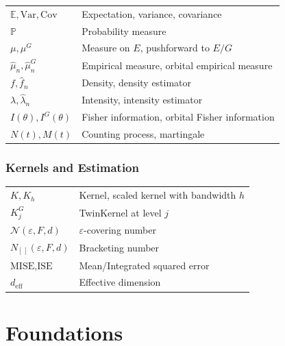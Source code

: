\documentclass[11pt,twoside,openright]{book}
\theoremstyle{plain}
\theoremstyle{definition}
\theoremstyle{remark}
\newcommand{\calN}{\mathcal{N}}
\newcommand{\E}{\mathbb{E}}
\newcommand{\Prob}{\mathbb{P}}
\newcommand{\var}{\mathrm{Var}}
\newcommand{\Cov}{\mathrm{Cov}}
\newcommand{\deff}{d_{\mathrm{eff}}}
\begin{document}
\begin{tabular}{ll}
$\E, \var, \Cov$ & Expectation, variance, covariance\\
$\Prob$ & Probability measure\\
$\mu, \mu^G$ & Measure on $E$, pushforward to $E/G$\\
$\hat{\mu}_n, \hat{\mu}_n^G$ & Empirical measure, orbital empirical measure\\
$f, \hat{f}_n$ & Density, density estimator\\
$\lambda, \hat{\lambda}_n$ & Intensity, intensity estimator\\
$I(\theta), I^G(\theta)$ & Fisher information, orbital Fisher information\\
$N(t), M(t)$ & Counting process, martingale\\
\end{tabular}

\section*{Kernels and Estimation}

\begin{tabular}{ll}
$K, K_h$ & Kernel, scaled kernel with bandwidth $h$\\
$K_j^G$ & TwinKernel at level $j$\\
$\calN(\varepsilon, F, d)$ & $\varepsilon$-covering number\\
$N_{[\,]}(\varepsilon, F, d)$ & Bracketing number\\
$\text{MISE}, \text{ISE}$ & Mean/Integrated squared error\\
$\deff$ & Effective dimension\\
\end{tabular}

\mainmatter


\part{Foundations}
\label{part:foundations}

\end{document}
